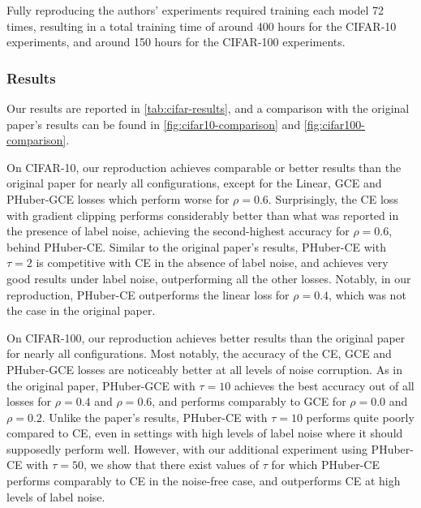 Fully reproducing the authors' experiments required training each model 72 times, resulting in a total training time of around 400 hours for the CIFAR-10 experiments, and around 150 hours for the CIFAR-100 experiments.

\subsubsection{Results}
Our results are reported in \autoref{tab:cifar-results}, and a comparison with the original paper's results can be found in \autoref{fig:cifar10-comparison} and \autoref{fig:cifar100-comparison}.

On CIFAR-10, our reproduction achieves comparable or better results than the original paper for nearly all configurations, except for the Linear, GCE and PHuber-GCE losses which perform worse for $\rho=0.6$. Surprisingly, the CE loss with gradient clipping performs considerably better than what was reported in the presence of label noise, achieving the second-highest accuracy for $\rho=0.6$, behind PHuber-CE. Similar to the original paper's results, PHuber-CE with $\tau=2$ is competitive with CE in the absence of label noise, and achieves very good results under label noise, outperforming all the other losses. Notably, in our reproduction, PHuber-CE outperforms the linear loss for $\rho=0.4$, which was not the case in the original paper.

On CIFAR-100, our reproduction achieves better results than the original paper for nearly all configurations. Most notably, the accuracy of the CE, GCE and PHuber-GCE losses are noticeably better at all levels of noise corruption. As in the original paper, PHuber-GCE with $\tau=10$ achieves the best accuracy out of all losses for $\rho=0.4$ and $\rho=0.6$, and performs comparably to GCE for $\rho=0.0$ and $\rho=0.2$. Unlike the paper's results, PHuber-CE with $\tau=10$ performs quite poorly compared to CE, even in settings with high levels of label noise where it should supposedly perform well. 
However, with our additional experiment using PHuber-CE with $\tau=50$, we show that there exist values of $\tau$ for which PHuber-CE performs comparably to CE in the noise-free case, and outperforms CE at high levels of label noise.

